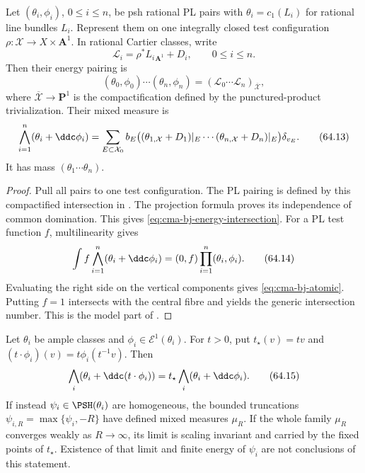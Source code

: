 \noindent\begin{minipage}{\linewidth}
\begin{theorem}\label{thm:cma-bj-intersection}
Let $(\theta_i,\phi_i)$, $0\leq i\leq n$, be psh rational PL pairs
with $\theta_i=c_1(L_i)$ for rational line bundles $L_i$.
Represent them on one integrally closed test configuration
$\rho\colon\mathcal X\to X\times\mathbf A^1$. In rational Cartier
classes, write
\[
 \mathcal L_i=\rho^*L_i{}_{\mathbf A^1}+D_i,
 \qquad 0\leq i\leq n.
\]
Then their energy pairing is
\[
  (\theta_0,\phi_0)\cdots(\theta_n,\phi_n)
  =(\mathcal L_0\cdots\mathcal L_n)_{\overline{\mathcal X}},
\tag{64.12}\label{eq:cma-bj-energy-intersection}
\]
where $\overline{\mathcal X}\to\mathbf P^1$ is the compactification
defined by the punctured-product trivialization.
Their mixed measure is
\[
 \bigwedge_{i=1}^n(\theta_i+\ddc\phi_i)
 =\sum_{E\subset\mathcal X_0}b_E
   \bigl((\theta_{1,\mathcal X}+D_1)|_E\cdots
         (\theta_{n,\mathcal X}+D_n)|_E\bigr)\delta_{v_E}.
\tag{64.13}\label{eq:cma-bj-atomic}
\]
It has mass $(\theta_1\cdots\theta_n)$.
\end{theorem}
\end{minipage}\par

\begin{proof}
Pull all pairs to one test configuration.
The PL pairing is defined by this compactified intersection in
. The projection formula proves its
independence of common domination. This gives
\eqref{eq:cma-bj-energy-intersection}.
For a PL test function $f$, multilinearity gives
\[
 \int f\bigwedge_{i=1}^n(\theta_i+\ddc\phi_i)
 =(0,f)\prod_{i=1}^n(\theta_i,\phi_i).
\tag{64.14}\label{eq:cma-bj-duality}
\]
Evaluating the right side on the vertical components gives
\eqref{eq:cma-bj-atomic}.
Putting $f=1$ intersects with the central fibre and yields the generic
intersection number.
This is the model part of
\cite[Sections~3 and~7]{BJ22}.
\end{proof}

\begin{corollary}
\label{cor:cma-bj-homogeneous}
Let $\theta_i$ be ample classes and $\phi_i\in\mathcal E^1(\theta_i)$.
For $t>0$, put $t_\star(v)=tv$ and
$(t\cdot\phi_i)(v)=t\phi_i(t^{-1}v)$. Then
\[
 \bigwedge_i(\theta_i+\ddc(t\cdot\phi_i))
 =t_\star\bigwedge_i(\theta_i+\ddc\phi_i).
\tag{64.15}\label{eq:cma-bj-scaling}
\]
If instead $\psi_i\in\PSH(\theta_i)$ are homogeneous, the bounded
truncations $\psi_{i,R}=\max\{\psi_i,-R\}$ have defined mixed measures
$\mu_R$. If the whole family $\mu_R$ converges weakly as $R\to\infty$,
its limit is scaling invariant and carried by the fixed points of
$t_\star$. Existence of that limit and finite energy of $\psi_i$ are
not conclusions of this statement.
\end{corollary}

